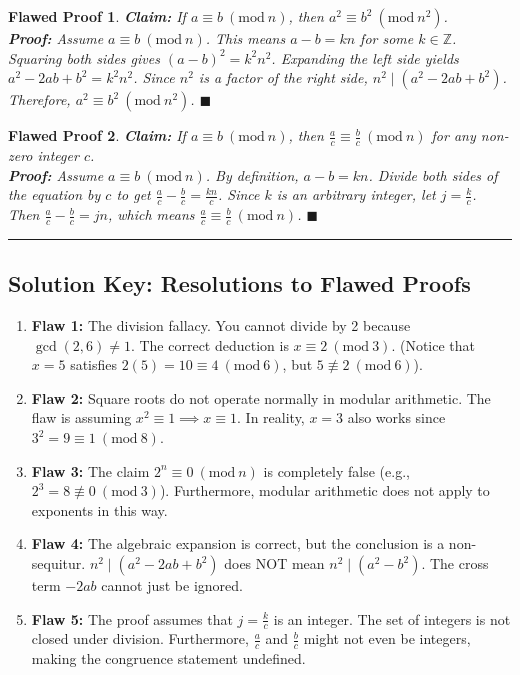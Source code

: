 \documentclass[11pt]{article}
\newtheorem{flaw}{Flawed Proof}
\newcommand{\Z}{\mathbb{Z}}
\newcommand{\modulo}[1]{\ (\mathrm{mod}\ #1)}
\begin{document}
\begin{flaw}
\textbf{Claim:} If $a \equiv b \modulo{n}$, then $a^2 \equiv b^2 \modulo{n^2}$. \\
\textbf{Proof:} Assume $a \equiv b \modulo{n}$. This means $a - b = kn$ for some $k \in \Z$. Squaring both sides gives $(a - b)^2 = k^2 n^2$. Expanding the left side yields $a^2 - 2ab + b^2 = k^2 n^2$. Since $n^2$ is a factor of the right side, $n^2 \mid (a^2 - 2ab + b^2)$. Therefore, $a^2 \equiv b^2 \modulo{n^2}$. $\blacksquare$
\end{flaw}

\begin{flaw}
\textbf{Claim:} If $a \equiv b \modulo{n}$, then $\frac{a}{c} \equiv \frac{b}{c} \modulo{n}$ for any non-zero integer $c$. \\
\textbf{Proof:} Assume $a \equiv b \modulo{n}$. By definition, $a - b = kn$. Divide both sides of the equation by $c$ to get $\frac{a}{c} - \frac{b}{c} = \frac{kn}{c}$. Since $k$ is an arbitrary integer, let $j = \frac{k}{c}$. Then $\frac{a}{c} - \frac{b}{c} = jn$, which means $\frac{a}{c} \equiv \frac{b}{c} \modulo{n}$. $\blacksquare$
\end{flaw}

\vspace{1cm}
\hrule
\vspace{1cm}

\subsection*{Solution Key: Resolutions to Flawed Proofs}
\begin{enumerate}
    \item \textbf{Flaw 1:} The division fallacy. You cannot divide by 2 because $\gcd(2, 6) \neq 1$. The correct deduction is $x \equiv 2 \modulo{3}$. (Notice that $x=5$ satisfies $2(5)=10 \equiv 4 \modulo{6}$, but $5 \not\equiv 2 \modulo{6}$).
    \item \textbf{Flaw 2:} Square roots do not operate normally in modular arithmetic. The flaw is assuming $x^2 \equiv 1 \implies x \equiv 1$. In reality, $x=3$ also works since $3^2 = 9 \equiv 1 \modulo{8}$.
    \item \textbf{Flaw 3:} The claim $2^n \equiv 0 \modulo{n}$ is completely false (e.g., $2^3 = 8 \not\equiv 0 \modulo{3}$). Furthermore, modular arithmetic does not apply to exponents in this way.
    \item \textbf{Flaw 4:} The algebraic expansion is correct, but the conclusion is a non-sequitur. $n^2 \mid (a^2 - 2ab + b^2)$ does NOT mean $n^2 \mid (a^2 - b^2)$. The cross term $-2ab$ cannot just be ignored.
    \item \textbf{Flaw 5:} The proof assumes that $j = \frac{k}{c}$ is an integer. The set of integers is not closed under division. Furthermore, $\frac{a}{c}$ and $\frac{b}{c}$ might not even be integers, making the congruence statement undefined.
\end{enumerate}
\end{document}
